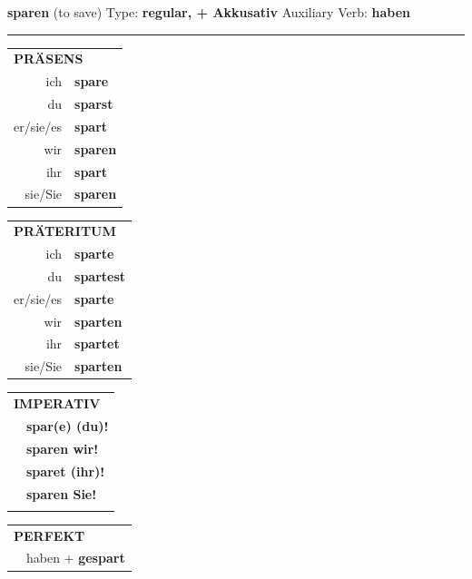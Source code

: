 \documentclass[10pt,a4paper]{revtex4-2}
\begin{document}
\begin{verbbox-acc}
    {\Large \bf sparen} (to save) \hfill Type: \textbf{regular, + Akkusativ} \hfill Auxiliary Verb: \textbf{haben} 
    
     \vspace{5pt}

    \hrule
    
    \vspace{5pt}

  \begin{tabular}{rl}
     \multicolumn{2}{l}{\textbf{PRÄSENS} }\\
    ich & \textbf{spare}\\
    du & \textbf{sparst}\\
    er/sie/es & \textbf{spart}\\
    wir & \textbf{sparen}\\
    ihr & \textbf{spart}\\
    sie/Sie & \textbf{sparen}\\
  \end{tabular}
  \hfill
     \begin{tabular}{rl}
    \multicolumn{2}{l}{\textbf{PRÄTERITUM} }\\
    ich & \textbf{sparte}\\
    du & \textbf{spartest}\\
    er/sie/es & \textbf{sparte}\\
    wir & \textbf{sparten}\\
    ihr & \textbf{spartet}\\
    sie/Sie & \textbf{sparten}\\
  \end{tabular}
  \hfill
  \begin{tabular}{rl}
     \multicolumn{2}{l}{\textbf{IMPERATIV} }\\
   & \textbf{spar(e) (du)!}\\
   & \textbf{sparen wir!}\\
   & \textbf{sparet (ihr)!}\\
   & \textbf{sparen Sie!}\\
   & \vspace{10pt}
  \end{tabular}

    \vspace{10pt}

 \begin{tabular}{rl}
     \multicolumn{2}{l}{\textbf{PERFEKT}}\\
  &  haben + \textbf{gespart}\\
  \end{tabular}
\hfill
   \begin{tabular}{rl}
   

\end{tabular}
\end{verbbox-acc}
\end{document}
